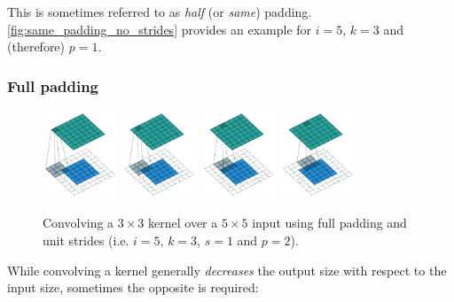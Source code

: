 \documentclass{article}
\begin{document}
This is sometimes referred to as {\em half} (or {\em same}) padding.
\autoref{fig:same_padding_no_strides} provides an example for $i = 5$, $k = 3$
and (therefore) $p = 1$.

\subsubsection{Full padding}

\begin{figure}[h]
    \centering
    \includegraphics[width=0.2\textwidth]{pdf/full_padding_no_strides_00.pdf}
    \includegraphics[width=0.2\textwidth]{pdf/full_padding_no_strides_01.pdf}
    \includegraphics[width=0.2\textwidth]{pdf/full_padding_no_strides_02.pdf}
    \includegraphics[width=0.2\textwidth]{pdf/full_padding_no_strides_03.pdf}
    \caption{\label{fig:full_padding_no_strides} Convolving a $3 \times 3$
        kernel over a $5 \times 5$ input using full padding and unit strides
        (i.e. $i = 5$, $k = 3$, $s = 1$ and $p = 2$).}
\end{figure}

While convolving a kernel generally {\em decreases} the output size with respect
to the input size, sometimes the opposite is required:
\end{document}
